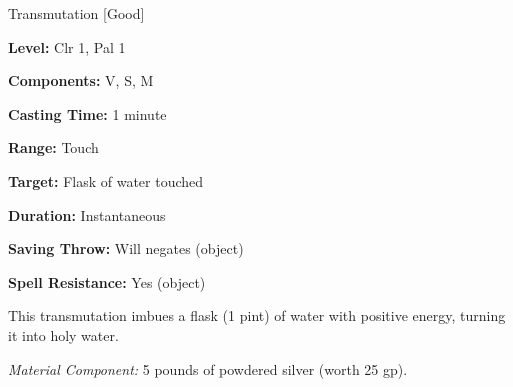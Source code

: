 
Transmutation [Good]

\textbf{Level:} Clr 1, Pal 1

\textbf{Components:} V, S, M

\textbf{Casting Time:} 1 minute

\textbf{Range:} Touch

\textbf{Target:} Flask of water touched

\textbf{Duration:} Instantaneous

\textbf{Saving Throw:} Will negates (object)

\textbf{Spell Resistance:} Yes (object)

This transmutation imbues a flask (1 pint) of water with positive energy, turning 
it into holy water.

\textit{Material Component:} 5 pounds of powdered silver (worth 25 gp).


